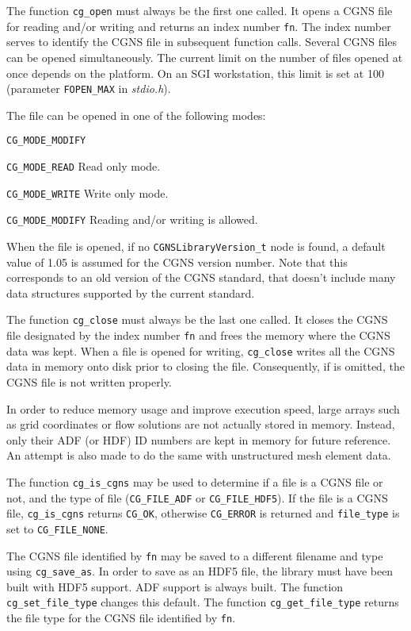 The function \texttt{cg\_open} must always be the first one called.
It opens a CGNS file for reading and/or writing and returns an index
number \texttt{fn}.
The index number serves to identify the CGNS file in subsequent
function calls.
Several CGNS files can be opened simultaneously.
The current limit on the number of files opened at once depends on the
platform.
On an SGI workstation, this limit is set at 100 (parameter
\texttt{FOPEN\_MAX} in \textit{stdio.h}).

The file can be opened in one of the following modes:

\begin{Ventryic}{\texttt{CG\_MODE\_MODIFY}}
\item [\texttt{CG\_MODE\_READ}]
      Read only mode.
\item [\texttt{CG\_MODE\_WRITE}]
      Write only mode.
\item [\texttt{CG\_MODE\_MODIFY}]
      Reading and/or writing is allowed.
\end{Ventryic}

When the file is opened, if no \texttt{CGNSLibraryVersion\_t} node is
found, a default value of 1.05 is assumed for the CGNS version number.
Note that this corresponds to an old version of the CGNS standard, that
doesn't include many data structures supported by the current standard.

The function \texttt{cg\_close} must always be the last one called.
It closes the CGNS file designated by the index number \texttt{fn} and
frees the memory where the CGNS data was kept.
When a file is opened for writing, \texttt{cg\_close} writes all the
CGNS data in memory onto disk prior to closing the file.
Consequently, if is omitted, the CGNS file is not written properly.

In order to reduce memory usage and improve execution speed,
large arrays such as grid coordinates or flow solutions are not actually
stored in memory.
Instead, only their ADF (or HDF) ID numbers are kept in memory for future
reference.
An attempt is also made to do the same with unstructured mesh element data.

The function \texttt{cg\_is\_cgns} may be used to determine if a file is a 
CGNS file or not, and the type of file (\texttt{CG\_FILE\_ADF} or \texttt{CG\_FILE\_HDF5}). 
If the file is a CGNS file, \texttt{cg\_is\_cgns} returns \texttt{CG\_OK}, 
otherwise \texttt{CG\_ERROR} is returned and \texttt{file\_type} is set to 
\texttt{CG\_FILE\_NONE}. 

The CGNS file identified by \texttt{fn} may be saved to a different filename 
and type using \texttt{cg\_save\_as}. In order to save as an HDF5 file, the 
library must have been built with HDF5 support. ADF support is always built.
The function 
\texttt{cg\_set\_file\_type} changes this default. The function 
\texttt{cg\_get\_file\_type} returns the file type for the CGNS file identified by 
\texttt{fn}. 

